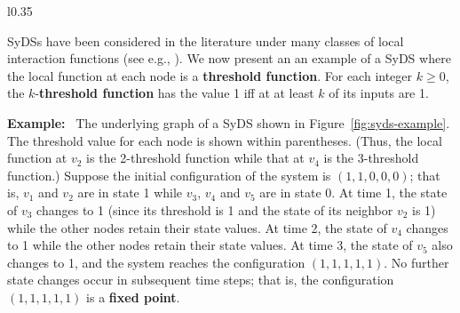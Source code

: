 \begin{wrapfigure}[16]{l}{0.35\textwidth}
\centering

\caption{\small{An Example of a SyDS where each node has a
threshold function. The threshold values are shown in parentheses.}}
\label{fig:syds-example}
\smallskip
\end{wrapfigure}
SyDSs have been considered in the literature under many 
classes of local interaction functions 
(see e.g., \cite{BH+07,Kawachi-et-al-2017}).
We now present an an example of a SyDS where the local function
at each node is a \textbf{threshold function}. 
For each integer $k \geq 0$, the $k$-\textbf{threshold function} has the
value 1 iff at at least $k$ of its inputs are 1.

\noindent
\textbf{Example:}~
The underlying graph of a SyDS shown in
Figure~\ref{fig:syds-example}.
The threshold value for each node is shown within parentheses. 
(Thus, the local function at $v_2$ is the 2-threshold function
while that at $v_4$ is the 3-threshold function.)
Suppose the initial configuration of the system is $(1, 1, 0, 0, 0)$;
that is,
$v_1$ and $v_2$ are in state 1 while 
$v_3$, $v_4$ and $v_5$ are in state 0. 
At time 1, the state of $v_3$ changes to 1 (since its threshold is 1
and the state of its neighbor $v_2$ is 1) while
the other nodes retain their state values.
At time 2, the state of $v_4$ changes to 1 
while the other nodes retain their state values.
At time 3, the state of $v_5$ also changes to 1,
and the system reaches the configuration $(1, 1, 1, 1, 1)$.
No further state changes occur in subsequent time steps;
that is, the configuration $(1, 1, 1, 1, 1)$ is a \textbf{fixed point}.

\smallskip


\smallskip

